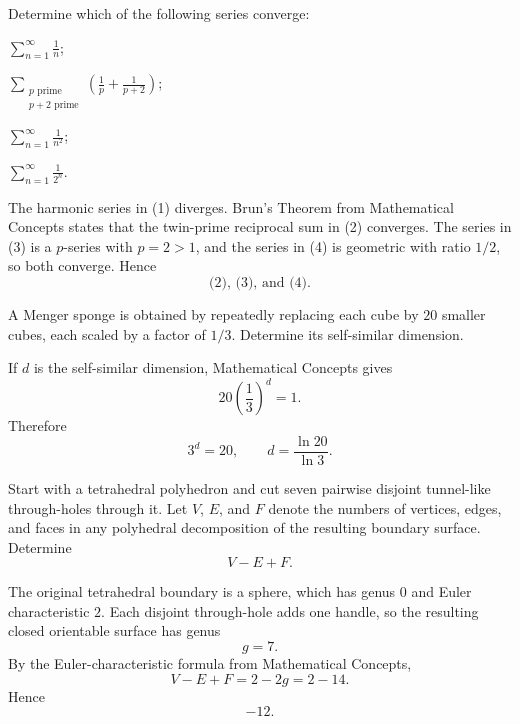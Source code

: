     \begin{expectedproblem}
        Determine which of the following series converge:
        \begin{problemchoices}
            \item $\displaystyle\sum_{n=1}^{\infty}\frac1n$;
            \item $\displaystyle
                  \sum_{\substack{p\text{ prime}\\p+2\text{ prime}}}
                  \left(\frac1p+\frac1{p+2}\right)$;
            \item $\displaystyle\sum_{n=1}^{\infty}\frac1{n^2}$;
            \item $\displaystyle\sum_{n=1}^{\infty}\frac1{2^n}$.
        \end{problemchoices}
    \end{expectedproblem}

    \begin{solution}
        The harmonic series in (1) diverges. Brun's Theorem from Mathematical
        Concepts states that the twin-prime reciprocal sum in (2) converges.
        The series in (3) is a $p$-series with $p=2>1$, and the series in (4)
        is geometric with ratio $1/2$, so both converge. Hence
        \[
            \boxed{\text{(2), (3), and (4)}}.
        \]
    \end{solution}

    \begin{expectedproblem}
        A Menger sponge is obtained by repeatedly replacing each cube by $20$
        smaller cubes, each scaled by a factor of $1/3$. Determine its
        self-similar dimension.
    \end{expectedproblem}

    \begin{solution}
        If $d$ is the self-similar dimension, Mathematical Concepts gives
        \[
            20\left(\frac13\right)^d=1.
        \]
        Therefore
        \[
            3^d=20,
            \qquad
            \boxed{d=\frac{\ln20}{\ln3}}.
        \]
    \end{solution}

    \begin{expectedproblem}
        Start with a tetrahedral polyhedron and cut seven pairwise disjoint
        tunnel-like through-holes through it. Let $V$, $E$, and $F$ denote the
        numbers of vertices, edges, and faces in any polyhedral decomposition
        of the resulting boundary surface. Determine
        \[
            V-E+F.
        \]
    \end{expectedproblem}

    \begin{solution}
        The original tetrahedral boundary is a sphere, which has genus $0$ and
        Euler characteristic $2$. Each disjoint through-hole adds one handle,
        so the resulting closed orientable surface has genus
        \[
            g=7.
        \]
        By the Euler-characteristic formula from Mathematical Concepts,
        \[
            V-E+F=2-2g=2-14.
        \]
        Hence
        \[
            \boxed{-12}.
        \]
    \end{solution}

